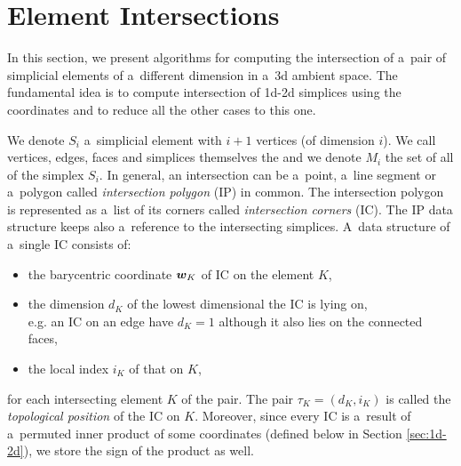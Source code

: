 \section{Element Intersections}
\label{sec:element intersecitons}
In this section, we present algorithms for computing the intersection of a~pair of simplicial elements of a~different dimension in a~3d ambient space. 
The fundamental idea is to compute intersection of 1d-2d 
simplices using the \plucker coordinates and to reduce all the other cases to this one. 

We denote $S_i$ a~simplicial element with $i+1$ vertices (of dimension $i$). We call vertices, edges, faces and simplices themselves the \nfaces and we denote
$M_i$ the set of all \nfaces of the simplex $S_i$.
In general, an intersection can be a~point, a~line segment or a~polygon called \emph{intersection polygon} (IP) in common.
The intersection polygon is represented as a~list of its corners called \emph{intersection corners} (IC). The IP data structure keeps also 
a~reference to the intersecting simplices. A~data structure of a~single IC consists of:
\begin{itemize}
 \item the barycentric coordinate $\mathbf{\boldsymbol{w}}_K$ of IC on the element $K$,
 \item the dimension $d_K$ of the lowest dimensional \nface the IC is lying on,\\
    e.g. an IC on an edge have $d_K=1$ although it also lies on the connected faces,
 \item the local index $i_K$ of that \nface on $K$,
\end{itemize}
for each intersecting element $K$ of the pair. The pair $\tau_K = (d_K, i_K)$
is called the \emph{topological position} of the IC on  $K$. Moreover, since every IC is a~result of a~permuted
inner product of some \plucker coordinates (defined below in Section \ref{sec:1d-2d}), we store the sign of the product as well.


